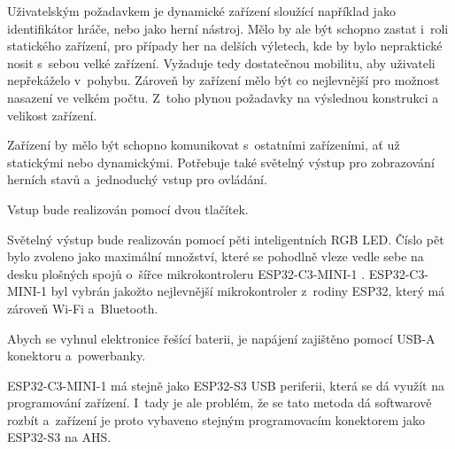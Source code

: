 Uživatelským požadavkem je dynamické zařízení sloužící například jako identifikátor hráče, nebo jako herní nástroj.
Mělo by ale být schopno zastat i~roli statického zařízení, pro případy her na delších výletech, kde by bylo nepraktické nosit s~sebou velké zařízení.
Vyžaduje tedy dostatečnou mobilitu, aby uživateli nepřekáželo v~pohybu.
Zároveň by zařízení mělo být co nejlevnější pro možnost nasazení ve velkém počtu.
Z~toho plynou požadavky na výslednou konstrukci a velikost zařízení.

Zařízení by mělo být schopno komunikovat s~ostatními zařízeními, ať už statickými nebo dynamickými.
Potřebuje také světelný výstup pro zobrazování herních stavů a~jednoduchý vstup pro ovládání.

Vstup bude realizován pomocí dvou tlačítek.

Světelný výstup bude realizován pomocí pěti inteligentních RGB LED.
Číslo pět bylo zvoleno jako maximální množství, které se pohodlně vleze vedle sebe na desku plošných spojů o~šířce mikrokontroleru ESP32-C3-MINI-1 \cite{ESP32C3}.
ESP32-C3-MINI-1 byl vybrán jakožto nejlevnější mikrokontroler z~rodiny ESP32, který má zároveň Wi-Fi a~Bluetooth.

Abych se vyhnul elektronice řešící baterii, je napájení zajištěno pomocí USB-A konektoru a~powerbanky.

ESP32-C3-MINI-1 má stejně jako ESP32-S3 USB periferii, která se dá využít na programování zařízení.
I~tady je ale problém, že se tato metoda dá softwarově rozbít a~zařízení je proto vybaveno stejným programovacím konektorem jako ESP32-S3 na AHS.





